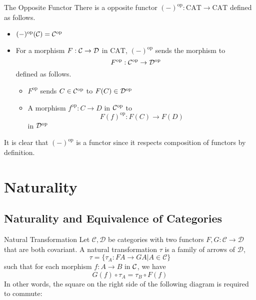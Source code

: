 \documentclass[a4paper]{article}
\begin{document}
\begin{defn}{The Opposite Functor}{} There is a opposite functor $(-)^\text{op}:\text{CAT}\to\text{CAT}$ defined as follows. 
\begin{itemize}
\item $(-)^\text{op}(\mathcal{C})=\mathcal{C}^\text{op}$
\item For a morphism $F:\mathcal{C}\to\mathcal{D}$ in $\text{CAT}$, $(-)^\text{op}$ sends the morphism to $$F^\text{op}:\mathcal{C}^\text{op}\to\mathcal{D}^\text{op}$$ defined as follows. 
\begin{itemize}
\item $F^\text{op}$ sends $C\in\mathcal{C}^\text{op}$ to $F(C)\in\mathcal{D}^\text{op}$
\item A morphism $f^\text{op}:C\to D$ in $\mathcal{C}^\text{op}$ to $$F(f)^\text{op}:F(C)\to F(D)$$ in $\mathcal{D}^\text{op}$
\end{itemize}
\end{itemize}
\end{defn}

It is clear that $(-)^\text{op}$ is a functor since it respects composition of functors by definition. 

\pagebreak
\section{Naturality}
\subsection{Naturality and Equivalence of Categories}
\begin{defn}{Natural Transformation}{} Let $\mathcal{C},\mathcal{D}$ be categories with two functors $F,G:\mathcal{C}\to\mathcal{D}$ that are both covariant. A natural transformation $\tau$ is a family of arrows of $\mathcal{D}$, $$\tau=\{\tau_A:FA\to GA|A\in\mathcal{C}\}$$ such that for each morphism $f:A\to B$ in $\mathcal{C}$, we have 
$$G(f)\circ\tau_A=\tau_B\circ F(f)$$ In other words, the square on the right side of the following diagram is required to commute: \\~\\
\end{defn}
\end{document}
